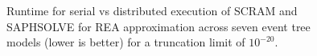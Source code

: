 \begin{figure}[]
  \centering
  
  \caption{Runtime for serial vs distributed execution of SCRAM and SAPHSOLVE for REA approximation across seven event tree models (lower is better) for a truncation limit of $10^{-20}$.}
  \label{fig:distributed_rea_runtime_1e20}
\end{figure}